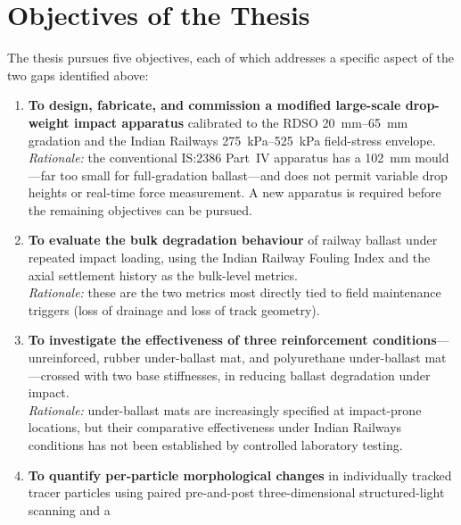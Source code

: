 \section{Objectives of the Thesis}
\label{sec:intro-objectives}

The thesis pursues five objectives, each of which addresses a specific
aspect of the two gaps identified above:

\begin{enumerate}[label=(\roman*),leftmargin=*,itemsep=6pt]
    \item \textbf{To design, fabricate, and commission a modified
          large-scale drop-weight impact apparatus} calibrated to the
          \gls{RDSO} \SIrange{20}{65}{\milli\metre} gradation and the
          Indian Railways \SIrange{275}{525}{\kilo\pascal} field-stress
          envelope.\\
          \textit{Rationale:} the conventional IS:2386 Part~IV apparatus
          has a \SI{102}{\milli\metre} mould---far too small for
          full-gradation ballast---and does not permit variable drop
          heights or real-time force measurement. A new apparatus is
          required before the remaining objectives can be pursued.
    \item \textbf{To evaluate the bulk degradation behaviour} of railway
          ballast under repeated impact loading, using the Indian Railway
          Fouling Index \FIIN{} and the axial settlement history as the
          bulk-level metrics.\\
          \textit{Rationale:} these are the two metrics most directly
          tied to field maintenance triggers (loss of drainage and
          loss of track geometry).
    \item \textbf{To investigate the effectiveness of three reinforcement
          conditions}---unreinforced, rubber under-ballast mat, and
          polyurethane under-ballast mat---crossed with two base
          stiffnesses, in reducing ballast degradation under impact.\\
          \textit{Rationale:} under-ballast mats are increasingly
          specified at impact-prone locations, but their comparative
          effectiveness under Indian Railways conditions has not been
          established by controlled laboratory testing.
    \item \textbf{To quantify per-particle morphological changes} in
          individually tracked tracer particles using paired pre-and-post
          three-dimensional structured-light scanning and a

\end{enumerate}
